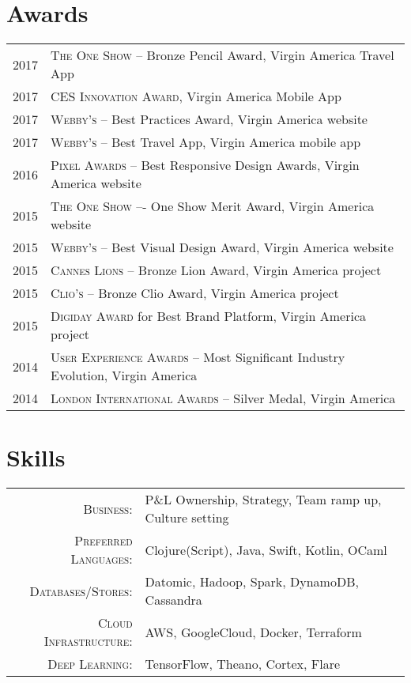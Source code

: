 \documentclass[a4paper,10pt]{article}
\begin{document}
\section{Awards}
\begin{tabular}{rl}
  \textsc{2017} & \textsc{The One Show} -- Bronze Pencil Award, Virgin America Travel App \\
  \textsc{2017} & \textsc{CES Innovation Award}, Virgin America Mobile App \\
  \textsc{2017} & \textsc{Webby's} -- Best Practices Award, Virgin America website \\
  \textsc{2017} & \textsc{Webby's} -- Best Travel App, Virgin America mobile app \\
  \textsc{2016} & \textsc{Pixel Awards} -- Best Responsive Design Awards, Virgin America website \\
  \textsc{2015} & \textsc{The One Show} –- One Show Merit Award, Virgin America website \\
  \textsc{2015} & \textsc{Webby's} -- Best Visual Design Award, Virgin America website \\
  \textsc{2015} & \textsc{Cannes Lions} -- Bronze Lion Award, Virgin America project \\
  \textsc{2015} & \textsc{Clio's} -- Bronze Clio Award, Virgin America project \\
  \textsc{2015} & \textsc{Digiday Award} for Best Brand Platform, Virgin America project \\
  \textsc{2014} & \textsc{User Experience Awards} -- Most Significant Industry Evolution, Virgin America \\
  \textsc{2014} & \textsc{London International Awards} -- Silver Medal, Virgin America
\end{tabular}

\section{Skills}
\begin{tabular}{rl}
  \textsc{Business:} & P\&L Ownership, Strategy, Team ramp up, Culture setting \\

  \textsc{Preferred Languages:} & Clojure(Script), Java, Swift, Kotlin, OCaml \\

  \textsc{Databases/Stores:} & Datomic, Hadoop, Spark, DynamoDB, Cassandra \\

  \textsc{Cloud Infrastructure:} & AWS, GoogleCloud, Docker, Terraform \\

  \textsc{Deep Learning:} & TensorFlow, Theano, Cortex, Flare \\
\end{tabular}
\end{document}
